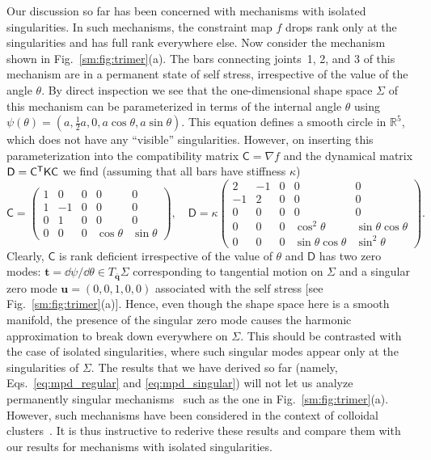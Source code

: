 Our discussion so far has been concerned with mechanisms with isolated singularities.
In such mechanisms, the constraint map $f$ drops rank only at the singularities and has full rank everywhere else.
Now consider the mechanism shown in Fig.~\ref{sm:fig:trimer}(a).
The bars connecting joints~1, 2, and 3 of this mechanism are in a permanent state of self stress, irrespective of the value of the angle $\theta$.
By direct inspection we see that the one-dimensional shape space $\Sigma$ of this mechanism can be parameterized in terms of the internal angle $\theta$ using $\psi(\theta) = (a, \frac{1}{2}a, 0, a\cos{\theta}, a\sin{\theta})$.
This equation defines a smooth circle in $\mathbb{R}^{5}$, which does not have any ``visible'' singularities.
However, on inserting this parameterization into the compatibility matrix $\mathsf{C} = \nabla f$ and the dynamical matrix $\mathsf{D} = \mathsf{C}^\mathsf{T}\mathsf{K}\mathsf{C}$ we find (assuming that all bars have stiffness $\kappa$)
%
\begin{equation}
  \mathsf{C} =
  \begin{pmatrix}
    1 & 0 & 0 & 0 & 0 \\
    1 & -1 & 0 & 0 & 0 \\
    0 & 1 & 0 & 0 & 0 \\
    0 & 0 & 0 & \cos \theta & \sin \theta
  \end{pmatrix},
  \quad
  \mathsf{D} =
  \kappa
  \begin{pmatrix}
    2 & -1 & 0 & 0 & 0 \\
    -1 & 2 & 0 & 0 & 0 \\
    0 & 0 & 0 & 0 & 0 \\
    0 & 0 & 0 & \cos ^2\theta & \sin \theta  \cos \theta \\
    0 & 0 & 0 & \sin \theta \cos \theta & \sin ^2\theta
  \end{pmatrix}.
\end{equation}
%
Clearly, $\mathsf{C}$ is rank deficient irrespective of the value of $\theta$ and $\mathsf{D}$ has two zero modes: $\bm{t} = \dd\psi/\dd\theta \in T_{\bar{\bm{q}}}\Sigma$ corresponding to tangential motion on $\Sigma$ and a singular zero mode $\bm{u} = (0, 0, 1, 0, 0)$ associated with the self stress [see Fig.~\ref{sm:fig:trimer}(a)].
Hence, even though the shape space here is a smooth manifold, the presence of the singular zero mode causes the harmonic approximation to break down everywhere on $\Sigma$.
This should be contrasted with the case of isolated singularities, where such singular modes appear only at the singularities of $\Sigma$.
The results that we have derived so far (namely, Eqs.~\ref{eq:mpd_regular} and \ref{eq:mpd_singular}) will not let us analyze permanently singular mechanisms~\cite{muller2019,wu2020} such as the one in Fig.~\ref{sm:fig:trimer}(a).
However, such mechanisms have been considered in the context of colloidal clusters~\cite{kallus2017}.
It is thus instructive to rederive these results and compare them with our results for mechanisms with isolated singularities.

